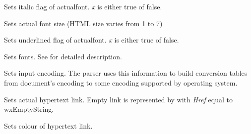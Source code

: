 
Sets italic flag of actualfont. {\it x} is either true of false.

\label{wxhtmlwinparsersetfontsize}


Sets actual font size (HTML size varies from 1 to 7)

\label{wxhtmlwinparsersetfontunderlined}


Sets underlined flag of actualfont. {\it x} is either true of false.

\label{wxhtmlwinparsersetfonts}


Sets fonts. See  for
detailed description.

\label{wxhtmlwinparsersetinputencoding}


Sets input encoding. The parser uses this information to build conversion
tables from document's encoding to some encoding supported by operating
system.

\label{wxhtmlwinparsersetlink}


Sets actual hypertext link. Empty link is represented
by  with {\it Href} equal
to wxEmptyString.

\label{wxhtmlwinparsersetlinkcolor}


Sets colour of hypertext link.

